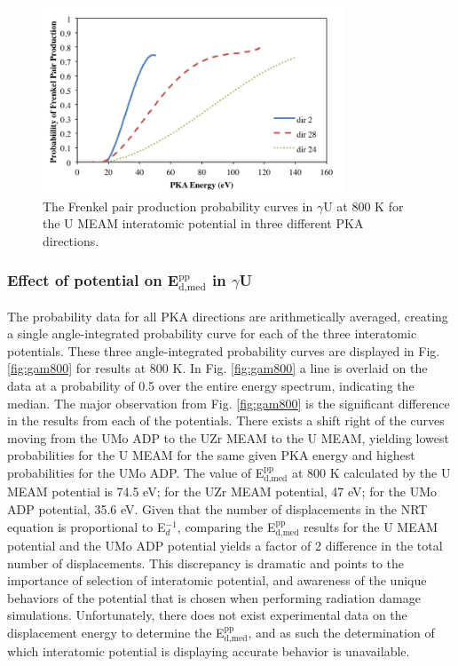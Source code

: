 \documentclass[review]{elsarticle}
\begin{document}
\begin{figure}[h]
 \centering
 \includegraphics[width=0.8\textwidth]{ed_dir.png} 
 \caption{The Frenkel pair production probability curves in $\gamma$U at 800 K for the U MEAM interatomic potential in three different PKA directions.}
 \label{fig:ed_dir}
\end{figure}

\FloatBarrier

\subsubsection{Effect of potential on E$^{\textrm{pp}}_{\textrm{d,med}}$ in $\gamma$U}

The probability data for all PKA directions are arithmetically averaged, creating a single angle-integrated probability curve for each of the three interatomic potentials. These three angle-integrated probability curves are displayed in Fig. \ref{fig:gam800} for results at 800 K. In Fig. \ref{fig:gam800} a line is overlaid on the data at a probability of 0.5 over the entire energy spectrum, indicating the median. The major observation from Fig. \ref{fig:gam800} is the significant difference in the results from each of the potentials. There exists a shift right of the curves moving from the UMo ADP to the UZr MEAM to the U MEAM, yielding lowest probabilities for the U MEAM for the same given PKA energy and highest probabilities for the UMo ADP. The value of E$^{\textrm{pp}}_{\textrm{d,med}}$ at 800 K calculated by the U MEAM potential is 74.5 eV; for the UZr MEAM potential, 47 eV; for the UMo ADP potential, 35.6 eV. Given that the number of displacements in the NRT equation \cite{norgett1975} is proportional to E$_{d}^{-1}$, comparing the E$^{\textrm{pp}}_{\textrm{d,med}}$ results for the U MEAM potential and the UMo ADP potential yields a factor of 2 difference in the total number of displacements. This discrepancy is dramatic and points to the importance of selection of interatomic potential, and awareness of the unique behaviors of the potential that is chosen when performing radiation damage simulations. Unfortunately, there does not exist experimental data on the displacement energy to determine the E$^{\textrm{pp}}_{\textrm{d,med}}$, and as such the determination of which interatomic potential is displaying accurate behavior is unavailable. 
\end{document}

